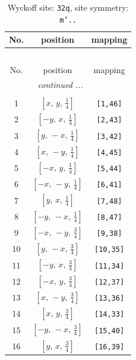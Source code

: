 \documentclass[fleqn,8pt]{jsarticle}
\begin{document}
\begin{longtable}{ccc}
\caption{Wyckoff site: {\tt 32q}, site symmetry: {\tt m'..}}
 \\
 \hline \hline
No. & position & mapping \\ \hline \endfirsthead

\multicolumn{2}{l}{\tablename\ \thetable{}} \\
 \hline \hline
No. & position & mapping \\ \hline \endhead

 \hline \hline
\multicolumn{2}{r}{\footnotesize\it continued ...} \\ \endfoot

 \hline \hline
\multicolumn{2}{r}{} \\ \endlastfoot

1 & $\left[ x,\, y,\, \frac{1}{4} \right]$ & {\tt [1,46]} \\ \hline
2 & $\left[ - y,\, x,\, \frac{1}{4} \right]$ & {\tt [2,43]} \\ \hline
3 & $\left[ y,\, - x,\, \frac{1}{4} \right]$ & {\tt [3,42]} \\ \hline
4 & $\left[ x,\, - y,\, \frac{1}{4} \right]$ & {\tt [4,45]} \\ \hline
5 & $\left[ - x,\, y,\, \frac{1}{4} \right]$ & {\tt [5,44]} \\ \hline
6 & $\left[ - x,\, - y,\, \frac{1}{4} \right]$ & {\tt [6,41]} \\ \hline
7 & $\left[ y,\, x,\, \frac{1}{4} \right]$ & {\tt [7,48]} \\ \hline
8 & $\left[ - y,\, - x,\, \frac{1}{4} \right]$ & {\tt [8,47]} \\ \hline
9 & $\left[ - x,\, - y,\, \frac{3}{4} \right]$ & {\tt [9,38]} \\ \hline
10 & $\left[ y,\, - x,\, \frac{3}{4} \right]$ & {\tt [10,35]} \\ \hline
11 & $\left[ - y,\, x,\, \frac{3}{4} \right]$ & {\tt [11,34]} \\ \hline
12 & $\left[ - x,\, y,\, \frac{3}{4} \right]$ & {\tt [12,37]} \\ \hline
13 & $\left[ x,\, - y,\, \frac{3}{4} \right]$ & {\tt [13,36]} \\ \hline
14 & $\left[ x,\, y,\, \frac{3}{4} \right]$ & {\tt [14,33]} \\ \hline
15 & $\left[ - y,\, - x,\, \frac{3}{4} \right]$ & {\tt [15,40]} \\ \hline
16 & $\left[ y,\, x,\, \frac{3}{4} \right]$ & {\tt [16,39]} \\ \hline

\end{longtable}
\end{document}
